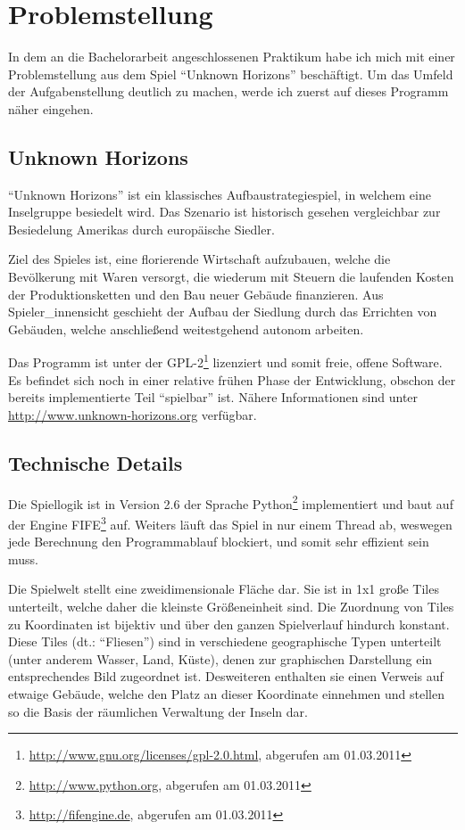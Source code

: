 \documentclass[%
			paper=a4,%
			DIV12,
			liststotoc,
			bibtotoc,
			draft=false,%
			titlepage,
			numbers=noendperiod
			]{scrartcl}
\newcommand{\footurl}[2]{\footnote{\url{#1}, abgerufen am #2}}
\begin{document}
\section{Problemstellung}

In dem an die Bachelorarbeit angeschlossenen Praktikum habe ich mich mit einer Problemstellung aus dem Spiel "`Unknown Horizons"' beschäftigt.
Um das Umfeld der Aufgabenstellung deutlich zu machen, werde ich zuerst auf dieses Programm näher eingehen.

\subsection{Unknown Horizons}
"`Unknown Horizons"' ist ein klassisches Aufbaustrategiespiel, in welchem eine Inselgruppe besiedelt wird. 
Das Szenario ist historisch gesehen vergleichbar zur Besiedelung Amerikas durch europäische Siedler.

Ziel des Spieles ist, eine florierende Wirtschaft aufzubauen, welche die Bevölkerung mit Waren versorgt, die wiederum mit Steuern die laufenden Kosten der Produktionsketten und den Bau neuer Gebäude finanzieren.
Aus Spieler\_innensicht geschieht der Aufbau der Siedlung durch das Errichten von Gebäuden, welche anschließend weitestgehend autonom arbeiten.

Das Programm ist unter der GPL-2\footurl{http://www.gnu.org/licenses/gpl-2.0.html}{01.03.2011} lizenziert und somit freie, offene Software. 
Es befindet sich noch in einer relative frühen Phase der Entwicklung, obschon der bereits implementierte Teil "`spielbar"' ist.
Nähere Informationen sind unter \url{http://www.unknown-horizons.org} verfügbar.

\subsection{Technische Details}

Die Spiellogik ist in Version 2.6 der Sprache Python\footurl{http://www.python.org}{01.03.2011} implementiert und
baut auf der Engine FIFE\footurl{http://fifengine.de}{01.03.2011} auf.
Weiters läuft das Spiel in nur einem Thread ab, weswegen jede Berechnung den Programmablauf blockiert, und somit sehr effizient sein muss.

Die Spielwelt stellt eine zweidimensionale Fläche dar.
Sie ist in 1x1 große Tiles unterteilt, welche daher die kleinste Größeneinheit sind. 
Die Zuordnung von Tiles zu Koordinaten ist bijektiv und über den ganzen Spielverlauf hindurch konstant.
Diese Tiles (dt.: "`Fliesen"') sind in verschiedene geographische Typen unterteilt (unter anderem Wasser, Land, Küste), denen zur graphischen Darstellung ein entsprechendes Bild zugeordnet ist. Desweiteren enthalten sie einen Verweis auf etwaige Gebäude, welche den Platz an dieser Koordinate einnehmen und stellen so die Basis der räumlichen Verwaltung der Inseln dar.
\end{document}
